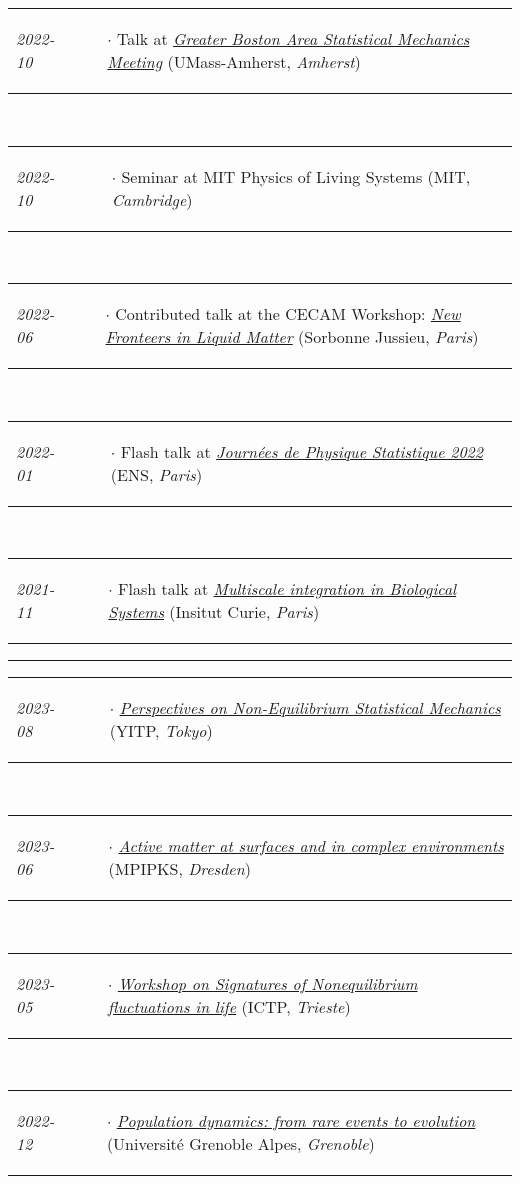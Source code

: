 \documentclass{scrartcl}
\newcommand{\NewItemEntry}[2]{
  \noindent
  \begin{tabular}[r]{p{2.5cm} p{14.0cm}}
    \-\hspace{0.5cm} \small \textit{#1}
    &
    \begin{itemize}
      \vspace{-0.65cm}
      \item[$\cdot$] #2
    \end{itemize}
  \end{tabular}
  \vspace{-0.2cm}
}
\begin{document}
\begin{cv}{}
\NewItemEntry{2022-10}{Talk at \textit{\href{https://sites.google.com/umass.edu/gbasm2022/home}{Greater Boston Area Statistical Mechanics Meeting}} \if{[replacing Prof. Julien Tailleur]}\fi (UMass-Amherst, \textit{Amherst})} \\[\v]
\NewItemEntry{2022-10}{Seminar at MIT Physics of Living Systems (MIT, \textit{Cambridge})}\\[\v]
\NewItemEntry{2022-06}{Contributed talk at the CECAM Workshop: \textit{\href{https://www.cecam.org/workshop-details/1111}{New Fronteers in Liquid Matter}} (Sorbonne Jussieu, \textit{Paris})}\\[\v]
\NewItemEntry{2022-01}{Flash talk at \textit{\href{https://jstat.phys.ens.fr/fr}{Journées de Physique Statistique 2022}} (ENS, \textit{Paris})}\\[\v]
\NewItemEntry{2021-11}{Flash talk at \textit{\href{https://training.institut-curie.org/courses/multiscale-integration-in-biological-systems-3}{Multiscale integration in Biological Systems}} (Insitut Curie, \textit{Paris})}
  
  


\vspace{1em}

\par\noindent\rule{\textwidth}{0.4pt}

\vspace{1.5em}



\noindent{}\vspace{1em}

\NewItemEntry{2023-08}{\textit{\href{https://www2.yukawa.kyoto-u.ac.jp/~yitp-ysf2022/index.php}{Perspectives on Non-Equilibrium Statistical Mechanics}} (YITP, \textit{Tokyo})}\\[\v]
\NewItemEntry{2023-06}{\textit{\href{https://www.pks.mpg.de/amsce23}{Active matter at surfaces and in complex environments}} (MPIPKS, \textit{Dresden})}\\[\v]
\NewItemEntry{2023-05}{\textit{\href{https://indico.ictp.it/event/10169/}{Workshop on Signatures of Nonequilibrium fluctuations in life}} (ICTP, \textit{Trieste})}\\[\v]
\NewItemEntry{2022-12}{\textit{\href{https://everevol.sciencesconf.org/}{Population dynamics: from rare events to evolution}} (Université Grenoble Alpes, \textit{Grenoble})}


\vspace{1em}


\end{cv}
\end{document}
